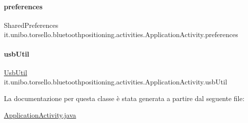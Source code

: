 \hypertarget{classit_1_1unibo_1_1torsello_1_1bluetoothpositioning_1_1activities_1_1ApplicationActivity_a3ee672ef79c268d0618ff3276c2e85f0_a3ee672ef79c268d0618ff3276c2e85f0}{}\label{classit_1_1unibo_1_1torsello_1_1bluetoothpositioning_1_1activities_1_1ApplicationActivity_a3ee672ef79c268d0618ff3276c2e85f0_a3ee672ef79c268d0618ff3276c2e85f0} 
\paragraph{\texorpdfstring{preferences}{preferences}}
{\footnotesize\ttfamily Shared\+Preferences it.\+unibo.\+torsello.\+bluetoothpositioning.\+activities.\+Application\+Activity.\+preferences\hspace{0.3cm}{\ttfamily [private]}}

\hypertarget{classit_1_1unibo_1_1torsello_1_1bluetoothpositioning_1_1activities_1_1ApplicationActivity_abe62157d98c81406ae3d79dbc0fd9093_abe62157d98c81406ae3d79dbc0fd9093}{}\label{classit_1_1unibo_1_1torsello_1_1bluetoothpositioning_1_1activities_1_1ApplicationActivity_abe62157d98c81406ae3d79dbc0fd9093_abe62157d98c81406ae3d79dbc0fd9093} 
\paragraph{\texorpdfstring{usb\+Util}{usbUtil}}
{\footnotesize\ttfamily \hyperlink{classit_1_1unibo_1_1torsello_1_1bluetoothpositioning_1_1util_1_1UsbUtil}{Usb\+Util} it.\+unibo.\+torsello.\+bluetoothpositioning.\+activities.\+Application\+Activity.\+usb\+Util\hspace{0.3cm}{\ttfamily [private]}}



La documentazione per questa classe è stata generata a partire dal seguente file\+:\begin{DoxyCompactItemize}
\item 
\hyperlink{ApplicationActivity_8java}{Application\+Activity.\+java}\end{DoxyCompactItemize}
